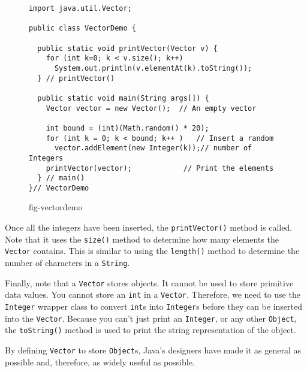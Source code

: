 \begin{figure}[hb]
\jjjprogstart
\begin{jjjlisting}[27pc]
\begin{lstlisting}
import java.util.Vector;

public class VectorDemo {

  public static void printVector(Vector v) {
    for (int k=0; k < v.size(); k++)
      System.out.println(v.elementAt(k).toString());
  } // printVector()

  public static void main(String args[]) {
    Vector vector = new Vector();  // An empty vector

    int bound = (int)(Math.random() * 20);
    for (int k = 0; k < bound; k++ )   // Insert a random
      vector.addElement(new Integer(k));// number of Integers
    printVector(vector);            // Print the elements
  } // main()
}// VectorDemo
\end{lstlisting}
\end{jjjlisting}
{fig-vectordemo}
\end{figure}

Once all the integers have been inserted, the {\tt printVector()}
method is called.  Note that it uses the {\tt size()} method to
determine how many elements the {\tt Vector} contains.  This is similar
to using the {\tt length()} method to determine the number of
characters in a {\tt String}.

Finally, note that a {\tt Vector} stores objects.  It cannot be used to
store primitive data values.  You cannot store an {\tt int} in a
{\tt Vector}. Therefore, we need to use the {\tt Integer} wrapper class to
convert {\tt int}s into {\tt Integer}s before they can be inserted
into the {\tt Vector}. Because you can't just print an {\tt Integer},
or any other {\tt Object}, the {\tt toString()} method is used to
print the string representation of the object.

By defining {\tt Vector} to store {\tt Object}s, Java's designers have
made it as general as possible and, therefore, as widely useful as 
possible.  



